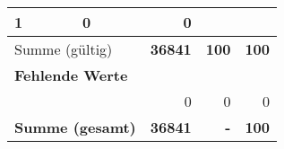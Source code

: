 \begin{longtable}{lXrrr}
       \num{1} &
       \num[round-mode=places,round-precision=2]{0} &
         \num[round-mode=places,round-precision=2]{0} \\
     \midrule
     \multicolumn{2}{l}{Summe (gültig)} &
       \textbf{\num{36841}} &
     \textbf{100} &
       \textbf{\num[round-mode=places,round-precision=2]{100}} \\
     \multicolumn{5}{l}{\textbf{Fehlende Werte}}\\
      & & 0 & 0 & 0 \\
     \midrule
     \multicolumn{2}{l}{\textbf{Summe (gesamt)}} &
          \textbf{\num{36841}} &
        \textbf{-} &
        \textbf{100} \\
     \bottomrule
     \end{longtable}
     
